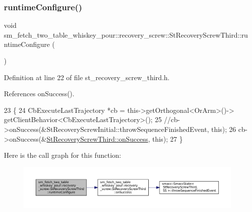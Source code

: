 \subsubsection{\texorpdfstring{runtime\+Configure()}{runtimeConfigure()}}
{\footnotesize\ttfamily void sm\+\_\+fetch\+\_\+two\+\_\+table\+\_\+whiskey\+\_\+pour\+::recovery\+\_\+screw\+::\+St\+Recovery\+Screw\+Third\+::runtime\+Configure (\begin{DoxyParamCaption}{ }\end{DoxyParamCaption})\hspace{0.3cm}{\ttfamily [inline]}}



Definition at line 22 of file st\+\_\+recovery\+\_\+screw\+\_\+third.\+h.



References on\+Success().


\begin{DoxyCode}
23             \{
24                 CbExecuteLastTrajectory *cb = this->getOrthogonal<OrArm>()->
      getClientBehavior<CbExecuteLastTrajectory>();
25                 \textcolor{comment}{//cb->onSuccess(&StRecoveryScrewInitial::throwSequenceFinishedEvent, this);}
26                 cb->onSuccess(&\hyperlink{structsm__fetch__two__table__whiskey__pour_1_1recovery__screw_1_1StRecoveryScrewThird_ae13a2183d4fef921f6a62c4e9eda292c}{StRecoveryScrewThird::onSuccess}, \textcolor{keyword}{this});
27             \}
\end{DoxyCode}
Here is the call graph for this function\+:
\nopagebreak
\begin{figure}[H]
\begin{center}
\leavevmode
\includegraphics[width=350pt]{structsm__fetch__two__table__whiskey__pour_1_1recovery__screw_1_1StRecoveryScrewThird_a8ff310a47918d29c1e1e807f6c022c54_cgraph}
\end{center}
\end{figure}
\mbox{\label{structsm__fetch__two__table__whiskey__pour_1_1recovery__screw_1_1StRecoveryScrewThird_adf69fea65e30c40b20c87f5eb36b4e7d}} 

